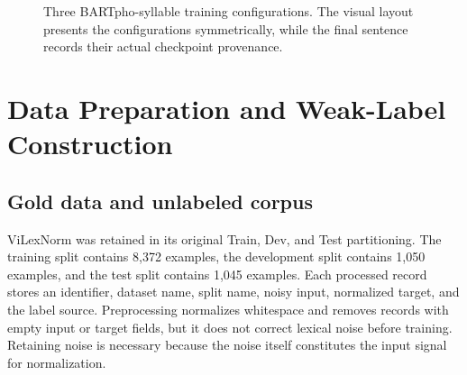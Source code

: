 \documentclass[11pt]{article}
\begin{document}
\begin{figure}[t]
\centering
{}
\caption{Three BARTpho-syllable training configurations. The visual layout presents the configurations symmetrically, while the final sentence records their actual checkpoint provenance.}
\label{fig:configurations}
\end{figure}

\section{Data Preparation and Weak-Label Construction}

\subsection{Gold data and unlabeled corpus}

ViLexNorm was retained in its original Train, Dev, and Test partitioning. The training split contains 8,372 examples, the development split contains 1,050 examples, and the test split contains 1,045 examples. Each processed record stores an identifier, dataset name, split name, noisy input, normalized target, and the label source. Preprocessing normalizes whitespace and removes records with empty input or target fields, but it does not correct lexical noise before training. Retaining noise is necessary because the noise itself constitutes the input signal for normalization.
\end{document}
